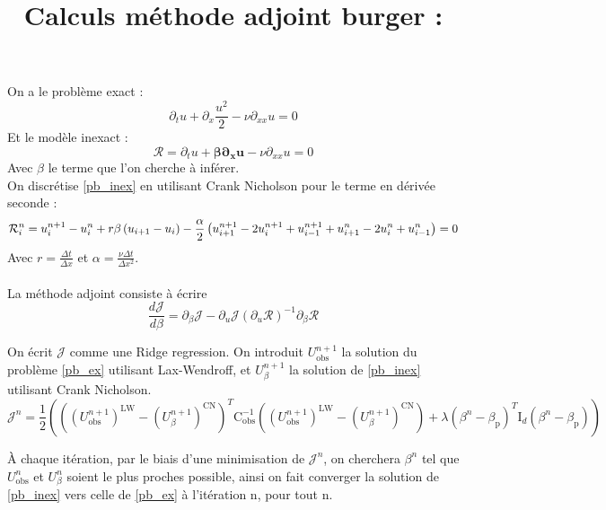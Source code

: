 \documentclass[a4paper,12pt]{article}
\title{\navy \textbf{Calculs méthode adjoint burger : \color{black}}}%
\date{}
\newcommand{\bepar}[1]{
	\left( #1 \right)  
}
\numberwithin{equation}{section} %
\begin{document}
\maketitle 
\setcounter{section}{1}
\noindent On a le problème exact :
\begin{equation} \tag{1 - exact}
\partial_t u + \partial_x \frac{u^2}{2} - \nu \partial_{xx}u = 0 \label{pb_ex}
\end{equation}
Et le modèle inexact :
\begin{equation} \tag{2 - inexact}
\mathcal{R} = \partial_t u + \mathbf{\beta \partial_x u} - \nu \partial_{xx}u = 0 \label{pb_inex}
\end{equation}
Avec $\beta$ le terme que l'on cherche à inférer.\\

\noindent  On discrétise \eqref{pb_inex} en utilisant Crank Nicholson pour le terme en dérivée seconde :
\begin{equation} \setcounter{equation}{1}
\mathcal{R}^n_i = u^{n+1}_i - u^n_i + r \beta  \bepar{u_{i+1} - u_i} - \frac{\alpha}{2} \bepar{u^{n+1}_{i+1} - 2u^{n+1}_i + u^{n+1}_{i-1} + u^{n}_{i+1} - 2 u^{n}_{i} + u^{n}_{i-1}}  = 0 \label{inex_discr}
\end{equation}
Avec $\displaystyle r = \frac{\Delta t}{\Delta x}$ et $ \displaystyle\alpha = \frac{\nu\Delta t}{\Delta x ^2}$.\\
 \\
 \noindent La méthode adjoint consiste à écrire 
 \begin{equation}
\frac{d\mathcal{J}}{d\beta} = \partial_\beta \mathcal{J} - \partial_u \mathcal{J} \bepar{\partial_u \mathcal{R}}^{-1}\partial_\beta\mathcal{R} \label{adjoint}
 \end{equation}
 
\noindent On écrit $\mathcal{J}$ comme une Ridge regression. On introduit $U^{n+1}_{\text{obs}}$ la solution du problème \eqref{pb_ex} utilisant Lax-Wendroff, et $U^{n+1}_\beta$ la solution de \eqref{pb_inex} utilisant Crank Nicholson.\\
 \begin{equation}
 \mathcal{J}^n = \frac{1}{2} \bepar{\bepar{\bepar{U^{n+1}_{\text{obs}}}^\text{LW} - \bepar{U^{n+1}_\beta}^\text{CN}}^T \text{C}_\text{obs}^{-1} \bepar{\bepar{U^{n+1}_{\text{obs}}}^\text{LW} - \bepar{U^{n+1}_\beta}^\text{CN}} + \lambda \bepar{\beta^n - \beta_{\text{p}}}^T \text{I}_d \bepar{\beta^n - \beta_\text{p}}}
 \end{equation}
 
 
\noindent À chaque itération, par le biais d'une minimisation de $\mathcal{J}^n$, on cherchera $\beta^n$ tel que $U^n_{\text{obs}}$ et $U^n_\beta$ soient le plus proches possible, ainsi on fait converger la solution de \eqref{pb_inex} vers celle de \eqref{pb_ex} à l'itération n, pour tout n.\\
   
\end{document}
